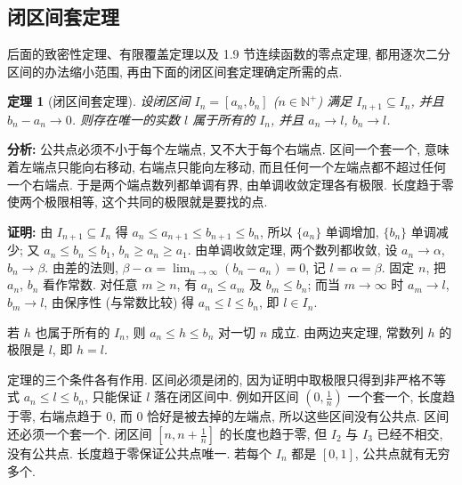 \documentclass[UTF8,openany]{ctexbook}
\theoremstyle{chinesetextbook}
\newtheorem{theorem}{定理}[section]
\newenvironment{cnproof}{\par\indent\textbf{证明:} \ignorespaces}{\par}
\begin{document}
\subsection{闭区间套定理}
后面的致密性定理、有限覆盖定理以及 1.9 节连续函数的零点定理, 都用逐次二分区间的办法缩小范围, 再由下面的闭区间套定理确定所需的点.
\begin{theorem}[闭区间套定理]
设闭区间 $I_n=[a_n,b_n]$ ($n\in\mathbb N^+$) 满足 $I_{n+1}\subseteq I_n$, 并且 $b_n-a_n\to0$. 则存在唯一的实数 $l$ 属于所有的 $I_n$, 并且 $a_n\to l$, $b_n\to l$.
\end{theorem}
\par\indent\textbf{分析:} 公共点必须不小于每个左端点, 又不大于每个右端点. 区间一个套一个, 意味着左端点只能向右移动, 右端点只能向左移动, 而且任何一个左端点都不超过任何一个右端点. 于是两个端点数列都单调有界, 由单调收敛定理各有极限. 长度趋于零使两个极限相等, 这个共同的极限就是要找的点.
\begin{cnproof}
由 $I_{n+1}\subseteq I_n$ 得 $a_n\le a_{n+1}\le b_{n+1}\le b_n$, 所以 $\{a_n\}$ 单调增加, $\{b_n\}$ 单调减少; 又 $a_n\le b_n\le b_1$, $b_n\ge a_n\ge a_1$. 由单调收敛定理, 两个数列都收敛, 设 $a_n\to\alpha$, $b_n\to\beta$. 由差的法则, $\displaystyle\beta-\alpha=\lim_{n\to\infty}(b_n-a_n)=0$, 记 $l=\alpha=\beta$. 固定 $n$, 把 $a_n$, $b_n$ 看作常数. 对任意 $m\ge n$, 有 $a_n\le a_m$ 及 $b_m\le b_n$; 而当 $m\to\infty$ 时 $a_m\to l$, $b_m\to l$, 由保序性 (与常数比较) 得 $a_n\le l\le b_n$, 即 $l\in I_n$.

若 $h$ 也属于所有的 $I_n$, 则 $a_n\le h\le b_n$ 对一切 $n$ 成立. 由两边夹定理, 常数列 $h$ 的极限是 $l$, 即 $h=l$.
\end{cnproof}
定理的三个条件各有作用. 区间必须是闭的, 因为证明中取极限只得到非严格不等式 $a_n\le l\le b_n$, 只能保证 $l$ 落在闭区间中. 例如开区间 $\displaystyle\left(0,\frac1n\right)$ 一个套一个, 长度趋于零, 右端点趋于 $0$, 而 $0$ 恰好是被去掉的左端点, 所以这些区间没有公共点. 区间还必须一个套一个. 闭区间 $\displaystyle\left[n,n+\frac1n\right]$ 的长度也趋于零, 但 $I_2$ 与 $I_3$ 已经不相交, 没有公共点. 长度趋于零保证公共点唯一. 若每个 $I_n$ 都是 $[0,1]$, 公共点就有无穷多个.
\end{document}
